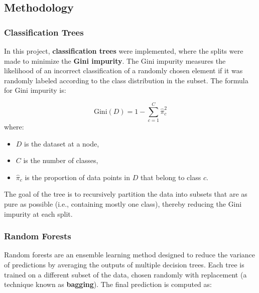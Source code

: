 \documentclass[fleqn,moreauthors,10pt]{ds_report}
\begin{document}
\subsection*{Methodology}

\subsubsection*{Classification Trees}

In this project, \textbf{classification trees} were implemented, where the splits were made to minimize the \textbf{Gini impurity}. The Gini impurity measures the likelihood of an incorrect classification of a randomly chosen element if it was randomly labeled according to the class distribution in the subset\cite{MLPP}. The formula for Gini impurity is:

\[
\text{Gini}(D) = 1 - \sum_{c=1}^{C} \hat{\pi}_c^2
\]
where:
\begin{itemize}
    \item \( D \) is the dataset at a node,
    \item \( C \) is the number of classes,
    \item \( \hat{\pi}_c \) is the proportion of data points in \( D \) that belong to class \( c \).
\end{itemize}

The goal of the tree is to recursively partition the data into subsets that are as pure as possible (i.e., containing mostly one class), thereby reducing the Gini impurity at each split.

%
%

\subsubsection*{Random Forests}


Random forests are an ensemble learning method designed to reduce the variance of predictions by averaging the outputs of multiple decision trees. Each tree is trained on a different subset of the data, chosen randomly with replacement (a technique known as \textbf{bagging})\cite{MLPP}. The final prediction is computed as:
\end{document}
